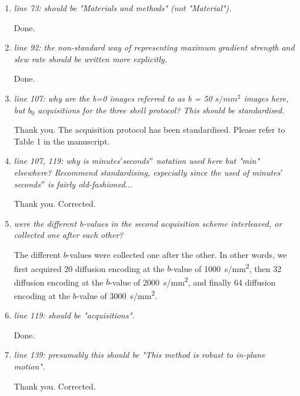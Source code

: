 \documentclass[a4paper,11pt,twoside]{report}
\begin{document}
\begin{enumerate}[resume]
    \item \textit{line 73: should be "Materials and methods" (not "Material").}

    \hspace{1em} Done.

    \item \textit{line 92: the non-standard way of representing maximum gradient strength and slew rate should be written more explicitly.}

    \hspace{1em} Done.

    \item \textit{line 107: why are the b=0 images referred to as b = 50 $s/mm^2$ images here, but $b_0$ acquisitions for the three shell protocol? This should be standardised.}

    \hspace{1em} Thank you. The acquisition protocol has been standardised.
    Please refer to Table 1 in the manuscript.

    \item \textit{line 107, 119: why is minutes$'$seconds$''$ notation used here but "min" elsewhere? Recommend standardising, especially since the used of minutes$'$seconds$''$ is fairly old-fashioned...}

    \hspace{1em} Thank you. Corrected.

    \item \textit{were the different b-values in the second acquisition scheme interleaved, or collected one after each other?}

    \hspace{1em}
    The different $b$-values were collected one after the other.
    In other words, we first acquired 20 diffusion encoding
    at the $b$-value of \SI{1000}{s/mm^2},
    then 32 diffusion encoding at the $b$-value of \SI{2000}{s/mm^2},
    and finally 64 diffusion encoding at the $b$-value of \SI{3000}{s/mm^2}.

    \item \textit{line 119: should be "acquisitions".}

    \hspace{1em} Done.

    \item \textit{line 139: presumably this should be "This method is robust to in-plane motion".}

    \hspace{1em} Thank you. Corrected.


\end{enumerate}
\end{document}

